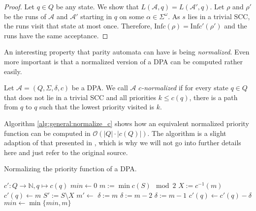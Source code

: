 \begin{proof}
	Let $q \in Q$ be any state. We show that $L(\mathcal{A}, q) = L(\mathcal{A}', q)$. Let $\rho$ and $\rho'$ be the runs of $\mathcal{A}$ and $\mathcal{A}'$ starting in $q$ on some $\alpha \in \Sigma^\omega$. As $s$ lies in a trivial SCC, the runs visit that state at most once. Therefore, $\text{Inf} c(\rho) = \text{Inf} c'(\rho')$ and the runs have the same acceptance.
\end{proof}

\vspace{10pt}

An interesting property that parity automata can have is being \emph{normalized}. Even more important is that a normalized version of a DPA can be computed rather easily.

\begin{defn}
	Let $\mathcal{A} = (Q, \Sigma, \delta, c)$ be a DPA. We call $\mathcal{A}$ \emph{$c$-normalized} if for every state $q \in Q$ that does not lie in a trivial SCC and all priorities $k \leq c(q)$, there is a path from $q$ to $q$ such that the lowest priority visited is $k$.
\end{defn}


Algorithm \ref{alg:general:normalize_c} shows how an equivalent normalized priority function can be computed in $\mathcal{O}(|Q| \cdot |c(Q)|)$. The algorithm is a slight adaption of that presented in \cite{CartonMaceiras99}, which is why we will not go into further details here and just refer to the original source.

\begin{algorithm}[h!] %
  \caption{Normalizing the priority function of a DPA.}
  \label{alg:general:normalize_c}
  \begin{algorithmic}[1]
      \State $c' : Q \rightarrow \mathbb{N}, q \mapsto c(q)$
      \State {}
      \State {}
    \EndFunction
    \Statex
        \State {}
      \EndIf
      \State $min \gets 0$
        \State $m := \min c(S) \mod 2$
        \State $X := c^{-1}(m)$
          \State $c'(q) \gets m$
        \EndFor
        \State $S' := S \setminus X$
        \State $m' \gets $
            \State $\delta := m$
          \Else
            \State $\delta := m-2$
          \EndIf
        \Else
          \State $\delta := m-1$
        \EndIf
          \State $c'(q) \gets c'(q) - \delta$
        \EndFor
        \State $min \gets \min \{min, m\}$
      \EndFor
      \State {}
    \EndFunction
  \end{algorithmic}
\end{algorithm}










